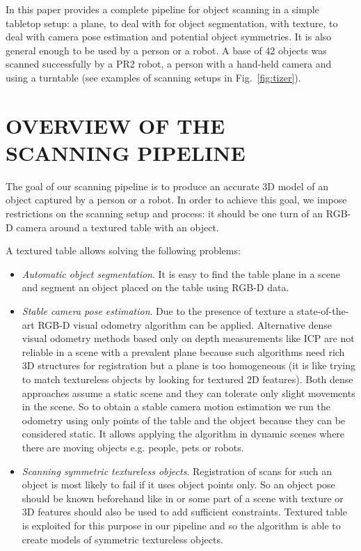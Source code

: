 \documentclass[letterpaper, 10 pt, conference]{ieeeconf}  %
\begin{document}
In this paper provides a complete pipeline for object scanning in
a simple tabletop setup: a plane, to deal with for object segmentation, with texture,
to deal with camera pose estimation and potential object symmetries. It is also general enough
to be used by a person or a robot. A base of 42 objects was
scanned successfully by a PR2 robot, a person with a hand-held camera 
and using a turntable (see examples of scanning setups 
in Fig.~\ref{fig:tizer}).


\section{OVERVIEW OF THE SCANNING PIPELINE}

The goal of our scanning pipeline is to produce an accurate 3D model
of an object captured by a person or a robot.
In order to achieve this goal, we
impose restrictions on the scanning setup and process: it should be
one turn of an RGB-D camera around a textured table with an object. 

A textured table allows solving the following problems:

\begin{itemize}

\item \textit{Automatic object segmentation}. It is easy to find the table plane
in a scene and segment an object placed on the table using RGB-D data.
\item \textit{Stable camera pose estimation}. Due to the presence of texture
a state-of-the-art RGB-D visual odometry algorithm can be applied.
Alternative dense visual odometry methods based only on depth measurements
like ICP are not reliable in a scene with a prevalent plane \cite{rusinkiewicz2002real}
because such algorithms need rich 3D structures for registration but a plane is too homogeneous
(it is like trying to match textureless objects by looking for textured 2D features).
Both dense approaches
assume a static scene and they can tolerate only slight movements in the scene.
So to obtain a stable camera motion estimation we run the odometry using only
points of the table and the object because they can be considered static.
It allows applying the algorithm in dynamic scenes where there are moving objects e.g. people, pets or robots.
\item \textit{Scanning symmetric textureless objects}. Registration of scans for such an object
is most likely to fail if it uses object points only. So an object pose should be known beforehand like in \cite{krainin2011manipulator}
or some part of a scene with
texture or 3D features should also be used to add sufficient constraints.
Textured table is exploited for this purpose in our pipeline
and so the algorithm is able to create models of symmetric textureless objects.
\end{itemize}
\end{document}

